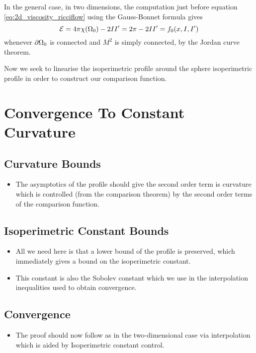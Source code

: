 \documentclass{amsart}
\begin{document}
In the general case, in two dimensions, the computation just before equation \eqref{eq:2d_viscosity_ricciflow} using the Gauss-Bonnet formula gives
\[
\operatorname{\mathcal{E}} = 4\pi\chi(\Omega_0) - 2II' = 2\pi - 2II' = f_0(x, I, I')
\]
whenever \(\partial {\Omega_0}\) is connected and \(M^2\) is simply connected, by the Jordan curve theorem.

Now we seek to linearise the isoperimetric profile around the sphere isoperimetric profile in order to construct our comparison function.

\section{Convergence To Constant Curvature}

\subsection{Curvature Bounds}

\begin{itemize}
\item The asymptotics of the profile should give the second order term is curvature which is controlled (from the comparison theorem) by the second order terms of the comparison function.
\end{itemize}

\subsection{Isoperimetric Constant Bounds}

\begin{itemize}
\item All we need here is that a lower bound of the profile is preserved, which immediately gives a bound on the isoperimetric constant.
\item This constant is also the Sobolev constant which we use in the interpolation inequalities used to obtain convergence.
\end{itemize}


\subsection{Convergence}

\begin{itemize}
\item The proof should now follow as in the two-dimensional case via interpolation which is aided by Isoperimetric constant control.
\end{itemize}
\end{document}
